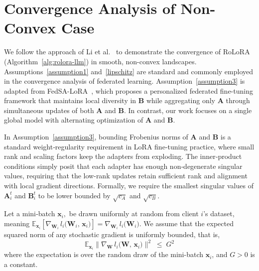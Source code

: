 \section{Convergence Analysis of Non-Convex Case} \label{app:convergence-non-convex}
We follow the approach of Li et al.~\cite{Li2020On} to demonstrate the convergence of RoLoRA (Algorithm~\ref{alg:rolora-llm}) in smooth, non-convex landscapes. Assumptions~\ref{assumption1} and~\ref{lipschitz} are standard and commonly employed in the convergence analysis of federated learning. Assumption~\ref{assumption3} is adapted from FedSA-LoRA~\cite{guo2025selective}, which proposes a personalized federated fine-tuning framework that maintains local diversity in $\mathbf{B}$ while aggregating only $\mathbf{A}$ through simultaneous updates of both $\mathbf{A}$ and $\mathbf{B}$. In contrast, our work focuses on a single global model with alternating optimization of $\mathbf{A}$ and $\mathbf{B}$.

In Assumption~\ref{assumption3}, bounding Frobenius norms of $\mathbf{A}$ and $\mathbf{B}$ is a standard weight‑regularity requirement in LoRA fine‑tuning practice, where small rank and scaling factors keep the adapters from exploding. The inner‑product conditions simply posit that each adapter has enough non‑degenerate singular values, requiring that the low-rank updates retain sufficient rank and alignment with local gradient directions. Formally, we require the smallest singular values of $\mathbf{A}_i^{t}$ and $\mathbf{B}_i^{t}$ to be lower bounded by $\sqrt{c_A}$ and $\sqrt{c_B}$.



\begin{assumption} \label{assumption1}
Let a mini‐batch $
\mathbf{x}_{i},
$
be drawn uniformly at random from client $i$’s dataset, meaning $\mathbb{E}_{\mathbf{x}_{i}} [\nabla_{\mathbf{W}_i}\,l_i\bigl(\mathbf{W}_i,\,\mathbf{x}_{i} \bigr) ]= \nabla_{\mathbf{W}_i}\,l_i\bigl(\mathbf{W}_i\bigr)$. We assume that the expected squared norm of any stochastic gradient is uniformly bounded, that is,
\[
\mathbb{E}_{\mathbf{x}_{i}}\!\bigl\|\nabla_{\mathbf{W}}\,l_i\bigl(\mathbf{W},\,\mathbf{x}_{i}\bigr)\bigr\|^2
\;\le\;G^2
\]
where the expectation is over the random draw of the mini-batch $\mathbf{x}_{i}$, and $G>0$ is a constant.
\end{assumption}

